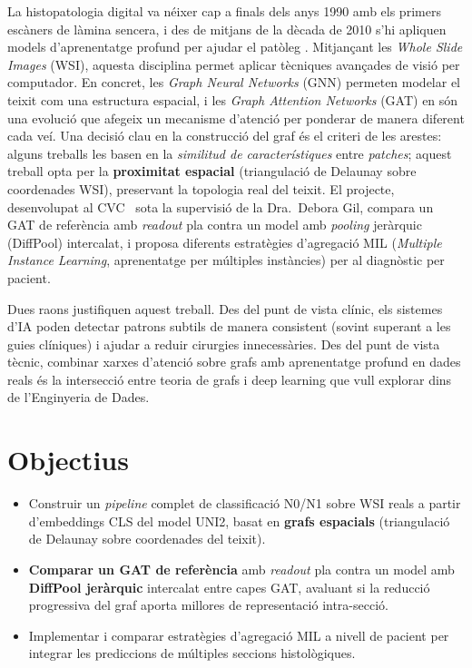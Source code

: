 \documentclass[10pt,a4paper,twocolumn,twoside]{article}
\begin{document}
La histopatologia digital va néixer cap a finals dels anys 1990 amb els primers escàners
de làmina sencera, i des de mitjans de la dècada de 2010 s'hi apliquen models
d'aprenentatge profund per ajudar el patòleg \cite{bejnordi2017camelyon}. Mitjançant les
\textit{Whole Slide Images} (WSI), aquesta disciplina permet aplicar
tècniques avançades de visió per computador. En concret, les \textit{Graph Neural Networks}
(GNN) permeten modelar el teixit com una estructura espacial, i les \textit{Graph Attention
Networks} (GAT) \cite{veličković2018graphattentionnetworks} en són una evolució que afegeix
un mecanisme d'atenció per ponderar de manera diferent cada veí.
Una decisió clau en la construcció del graf és el criteri de les arestes: alguns
treballs les basen en la \textit{similitud de característiques} entre \textit{patches}; aquest
treball opta per la \textbf{proximitat espacial} (triangulació de Delaunay sobre coordenades
WSI), preservant la topologia real del teixit. El projecte, desenvolupat al
CVC~\cite{cvc} sota la supervisió de la Dra.\ Debora Gil, compara un GAT de referència
amb \textit{readout} pla contra un model amb \textit{pooling} jeràrquic (DiffPool) intercalat,
i proposa diferents estratègies d'agregació MIL (\textit{Multiple Instance Learning},
aprenentatge per múltiples instàncies) per al diagnòstic per pacient.

Dues raons justifiquen aquest treball. Des del punt de vista clínic, els sistemes d'IA poden
detectar patrons subtils de manera consistent (sovint superant a les guies clíniques) i ajudar a reduir cirurgies
innecessàries. Des del punt de vista tècnic, combinar xarxes d'atenció sobre grafs amb
aprenentatge profund en dades reals és la intersecció entre teoria de grafs i deep learning
que vull explorar dins de l'Enginyeria de Dades.

\section{Objectius}

\begin{itemize}
    \item Construir un \textit{pipeline} complet de classificació N0/N1 sobre WSI reals a partir
    d'embeddings CLS del model UNI2, basat en \textbf{grafs espacials} (triangulació de Delaunay
    sobre coordenades del teixit).
    \item \textbf{Comparar un GAT de referència} amb \textit{readout} pla contra un model amb
    \textbf{DiffPool jeràrquic} intercalat entre capes GAT, avaluant si la reducció
    progressiva del graf aporta millores de representació intra-secció.
    \item Implementar i comparar estratègies d'agregació MIL a nivell de pacient per integrar
    les prediccions de múltiples seccions histològiques.
\end{itemize}
\end{document}
